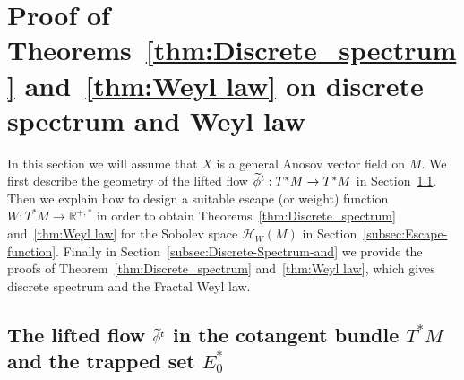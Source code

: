 \documentclass[AHL,Unicode,longabstracts,published]{cedram}
\newcommand{\clH}{\mathcal{H}}
\newcommand{\bbR}{\mathbb{R}}
\let\oldtilde\tilde
\renewcommand*{\tilde}[1]{\mathchoice{\widetilde{#1}}{\widetilde{#1}}{\oldtilde{#1}}{\oldtilde{#1}}}
\newcommand{\clH}{\mathcal{H}}
\newcommand{\bbR}{\mathbb{R}}
\begin{document}
\section{Proof of Theorems~\ref{thm:Discrete_spectrum} and~\ref{thm:Weyl law} on discrete spectrum and Weyl law}\label{sec:Proof-of-Theorem_discrete_spectrum}

In this section we will assume that $X$ is a general Anosov vector field on $M$. We first describe the geometry of the lifted flow $\tilde{\phi}^{t}:T^{*}M\rightarrow T^{*}M$ in Section~\ref{subsec:Dynamics-lifted-in}. Then we explain how to design a suitable escape (or weight) function $W:T^{*}M\rightarrow\bbR^{+,*}$ in order to obtain Theorems~\ref{thm:Discrete_spectrum} and~\ref{thm:Weyl law} for the Sobolev space $\clH _{W}(M)$ in Section~\ref{subsec:Escape-function}. Finally in Section~\ref{subsec:Discrete-Spectrum-and} we provide the proofs of Theorem~\ref{thm:Discrete_spectrum} and~\ref{thm:Weyl law}, which gives discrete spectrum and the Fractal Weyl law.

\subsection{The lifted flow \texorpdfstring{$\tilde{\phi}^{t}$}{phit} in the cotangent bundle \texorpdfstring{$T^{*}M$}{T*M} and the trapped set \texorpdfstring{$E_{0}^{*}$}{E0*}}\label{subsec:Dynamics-lifted-in}
\end{document}
